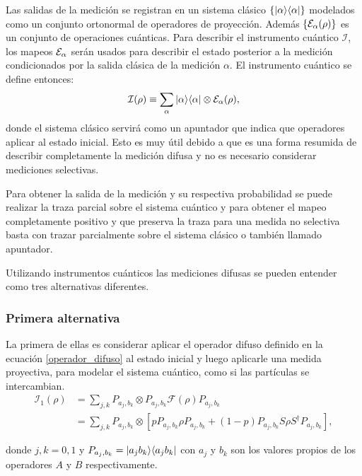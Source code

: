 Las salidas de la medición se registran en un sistema clásico $\{|\alpha\rangle \langle \alpha |\}$ modelados como un conjunto ortonormal de operadores de proyección. Además $\{\mathcal{E}_\alpha(\rho)\}$ es un conjunto de operaciones cuánticas. Para describir el instrumento cuántico $\mathcal{I}$, los mapeos $\mathcal{E}_\alpha$ serán usados para describir  el estado posterior a la medición condicionados por la salida clásica de la medición $\alpha$. El instrumento cuántico se define entonces:
\begin{equation}
    \mathcal{I}(\rho)\equiv\sum_\alpha |\alpha\rangle \langle\alpha|\otimes \mathcal{E}_\alpha(\rho),
\end{equation}
donde el sistema clásico servirá como un apuntador que indica que operadores aplicar al estado inicial. Esto es muy útil debido a que es una forma resumida de describir completamente la medición difusa y no es necesario considerar mediciones selectivas.


Para obtener la salida de la medición y su respectiva probabilidad se puede realizar la traza parcial sobre el sistema cuántico y para obtener el mapeo completamente positivo y que preserva la traza para una medida no selectiva basta con trazar parcialmente sobre el sistema clásico o también llamado apuntador.

Utilizando instrumentos cuánticos las mediciones difusas se pueden entender como tres alternativas diferentes. 

\subsubsection{Primera alternativa}
La primera de ellas es considerar aplicar el operador difuso definido en la ecuación {\ref{operador_difuso}} al estado inicial y luego aplicarle una medida proyectiva, para modelar el sistema cuántico, como  si las partículas se intercambian.\begin{equation}
    \begin{split}
        \mathcal{I}_1(\rho)&=\sum_{j,k}P_{a_j,b_k}\otimes P_{a_j,b_k} \mathcal{F}(\rho) P_{a_j,b_k}\\
        &=\sum_{j,k}P_{a_j,b_k}\otimes[p P_{a_j,b_k}\rho P_{a_j,b_k}+(1-p)P_{a_j,b_k}S\rho S^\dagger P_{a_j,b_k}],
\end{split}
\end{equation}

donde $j,k=0,1$ y $P_{a_j,b_k}=|a_j b_k\rangle \langle a_j b_k|$ con $a_j$ y $b_k$ son los valores propios de los operadores $A$ y $B$ respectivamente.

